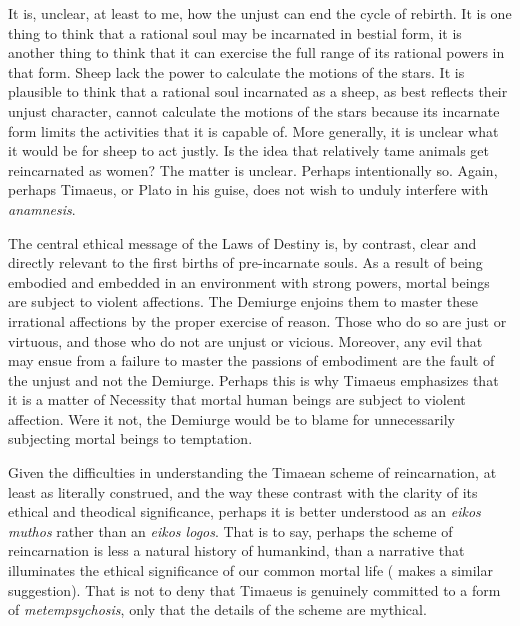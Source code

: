 It is, unclear, at least to me, how the unjust can end the cycle of rebirth. It is one thing to think that a rational soul may be incarnated in bestial form, it is another thing to think that it can exercise the full range of its rational powers in that form. Sheep lack the power to calculate the motions of the stars. It is plausible to think that a rational soul incarnated as a sheep, as best reflects their unjust character, cannot calculate the motions of the stars because its incarnate form limits the activities that it is capable of. More generally, it is unclear what it would be for sheep to act justly. Is the idea that relatively tame animals get reincarnated as women? The matter is unclear. Perhaps intentionally so. Again, perhaps Timaeus, or Plato in his guise, does not wish to unduly interfere with \emph{anamnesis}.

The central ethical message of the Laws of Destiny is, by contrast, clear and directly relevant to the first births of pre-incarnate souls. As a result of being embodied and embedded in an environment with strong powers, mortal beings are subject to violent affections. The Demiurge enjoins them to master these irrational affections by the proper exercise of reason. Those who do so are just or virtuous, and those who do not are unjust or vicious. Moreover, any evil that may ensue from a failure to master the passions of embodiment are the fault of the unjust and not the Demiurge. Perhaps this is why Timaeus emphasizes that it is a matter of Necessity that mortal human beings are subject to violent affection. Were it not, the Demiurge would be to blame for unnecessarily subjecting mortal beings to temptation. 

Given the difficulties in understanding the Timaean scheme of reincarnation, at least as literally construed, and the way these contrast with the clarity of its ethical and theodical significance, perhaps it is better understood as an \emph{eikos muthos} rather than an \emph{eikos logos}. That is to say, perhaps the scheme of reincarnation is less a natural history of humankind, than a narrative that illuminates the ethical significance of our common mortal life (\citealt[262]{Taylor:1929ov} makes a similar suggestion). That is not to deny that Timaeus is genuinely committed to a form of \emph{metempsychosis}, only that the details of the scheme are mythical.

